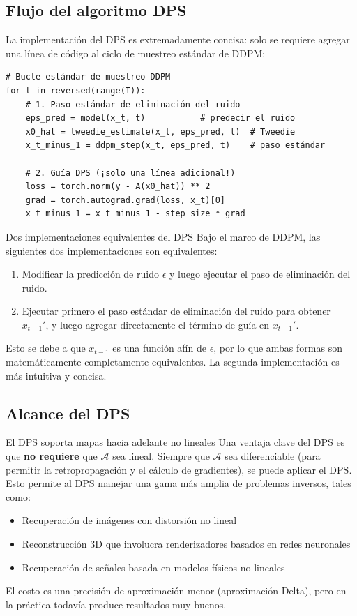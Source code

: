 \subsection{Flujo del algoritmo DPS}

La implementación del DPS es extremadamente concisa: solo se requiere agregar una línea de código al ciclo de muestreo estándar de DDPM:

\begin{lstlisting}[caption={Pseudocódigo de guía DPS}]
# Bucle estándar de muestreo DDPM
for t in reversed(range(T)):
    # 1. Paso estándar de eliminación del ruido
    eps_pred = model(x_t, t)           # predecir el ruido
    x0_hat = tweedie_estimate(x_t, eps_pred, t)  # Tweedie
    x_t_minus_1 = ddpm_step(x_t, eps_pred, t)    # paso estándar

    # 2. Guía DPS (¡solo una línea adicional!)
    loss = torch.norm(y - A(x0_hat)) ** 2
    grad = torch.autograd.grad(loss, x_t)[0]
    x_t_minus_1 = x_t_minus_1 - step_size * grad
\end{lstlisting}

\begin{importantbox}{Dos implementaciones equivalentes del DPS}
Bajo el marco de DDPM, las siguientes dos implementaciones son equivalentes:
\begin{enumerate}
    \item Modificar la predicción de ruido $\epsilon$ y luego ejecutar el paso de eliminación del ruido.
    \item Ejecutar primero el paso estándar de eliminación del ruido para obtener $x_{t-1}'$, y luego agregar directamente el término de guía en $x_{t-1}'$.
\end{enumerate}
Esto se debe a que $x_{t-1}$ es una función afín de $\epsilon$, por lo que ambas formas son matemáticamente completamente equivalentes. La segunda implementación es más intuitiva y concisa.
\end{importantbox}

\subsection{Alcance del DPS}

\begin{knowledgebox}{El DPS soporta mapas hacia adelante no lineales}
Una ventaja clave del DPS es que \textbf{no requiere} que $\mathcal{A}$ sea lineal. Siempre que $\mathcal{A}$ sea diferenciable (para permitir la retropropagación y el cálculo de gradientes), se puede aplicar el DPS. Esto permite al DPS manejar una gama más amplia de problemas inversos, tales como:
\begin{itemize}
    \item Recuperación de imágenes con distorsión no lineal
    \item Reconstrucción 3D que involucra renderizadores basados en redes neuronales
    \item Recuperación de señales basada en modelos físicos no lineales
\end{itemize}
El costo es una precisión de aproximación menor (aproximación Delta), pero en la práctica todavía produce resultados muy buenos.
\end{knowledgebox}

